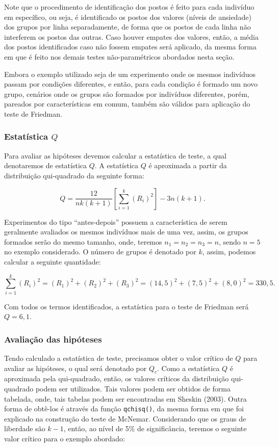 \documentclass[
  letterpaper,
  DIV=11,
  numbers=noendperiod]{scrreprt}
\begin{document}
Note que o procedimento de identificação dos postos é feito para cada
indivíduo em específico, ou seja, é identificado os postos dos valores
(níveis de ansiedade) dos grupos por linha separadamente, de forma que
os postos de cada linha não interferem os postos das outras. Caso houver
empates dos valores, então, a média dos postos identificados caso não
fossem empates será aplicado, da mesma forma em que é feito nos demais
testes não-paramétricos abordados nesta seção.

Embora o exemplo utilizado seja de um experimento onde os mesmos
indivíduos passam por condições diferentes, e então, para cada condição
é formado um novo grupo, cenários onde os grupos são formados por
indivíduos diferentes, porém, pareados por características em comum,
também são válidos para aplicação do teste de Friedman.

\hypertarget{estatuxedstica-q}{%
\subsubsection{\texorpdfstring{Estatística
\(Q\)}{Estatística Q}}\label{estatuxedstica-q}}

Para avaliar as hipóteses devemos calcular a estatística de teste, a
qual denotaremos de estatística \(Q\). A estatística \(Q\) é aproximada
a partir da distribuição qui-quadrado da seguinte forma:

\[Q=\displaystyle \frac{12}{n k(k+1)}\left[\sum_{i = 1}^k\left(R_i\right)^2\right]-3 n(k+1).\]

Experimentos do tipo ``antes-depois'' possuem a característica de serem
geralmente avaliados os mesmos indivíduos mais de uma vez, assim, os
grupos formados serão do mesmo tamanho, onde, teremos
\(n_1 = n_2 = n_3 = n\), sendo \(n = 5\) no exemplo considerado. O
número de grupos é denotado por \(k\), assim, podemos calcular a
seguinte quantidade:

\[\displaystyle \sum_{i = 1}^k(R_i)^2 = (R_1)^2 + (R_2)^2 + (R_3)^2 = (14,5)^2 + (7,5)^2 + (8,0)^2 = 330,5.\]

Com todos os termos identificados, a estatística para o teste de
Friedman será \(Q = 6,1\).

\hypertarget{avaliauxe7uxe3o-das-hipuxf3teses-5}{%
\subsubsection{Avaliação das
hipóteses}\label{avaliauxe7uxe3o-das-hipuxf3teses-5}}

Tendo calculado a estatística de teste, precisamos obter o valor crítico
de \(Q\) para avaliar as hipóteses, o qual será denotado por \(Q_c\).
Como a estatística \(Q\) é aproximada pela qui-quadrado, então, os
valores críticos da distribuição qui-quadrado podem ser utilizados. Tais
valores podem ser obtidos de forma tabelada, onde, tais tabelas podem
ser encontradas em Sheskin (2003). Outra forma de obtê-los é através da
função \texttt{qchisq()}, da mesma forma em que foi explicado na
construção do teste de McNemar. Considerando que os graus de liberdade
são \(k - 1\), então, ao nível de 5\% de significância, teremos o
seguinte valor crítico para o exemplo abordado:
\end{document}
